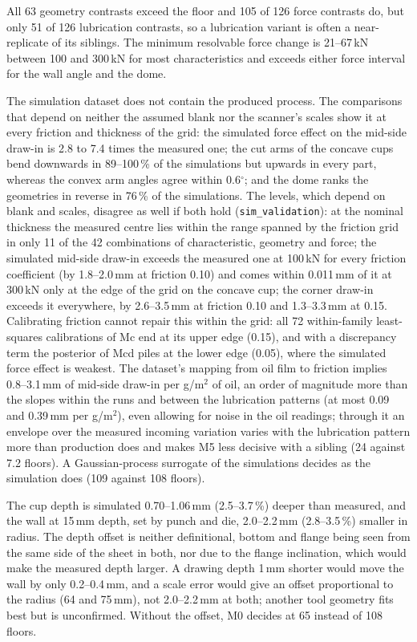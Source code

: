 \documentclass[pdflatex,sn-basic,lineno]{sn-jnl}
\newcommand{\res}[1]{\texttt{#1}}  %
\begin{document}
All 63 geometry contrasts exceed the floor and 105 of 126 force contrasts do, but only 51 of 126 lubrication contrasts, so a lubrication variant is often a near-replicate of its siblings. The minimum resolvable force change is 21--67\,kN between 100 and 300\,kN for most characteristics and exceeds either force interval for the wall angle and the dome.

The simulation dataset does not contain the produced process. The comparisons that depend on neither the assumed blank nor the scanner's scales show it at every friction and thickness of the grid: the simulated force effect on the mid-side draw-in is 2.8 to 7.4 times the measured one; the cut arms of the concave cups bend downwards in 89--100\,\% of the simulations but upwards in every part, whereas the convex arm angles agree within 0.6$^\circ$; and the dome ranks the geometries in reverse in 76\,\% of the simulations. The levels, which depend on blank and scales, disagree as well if both hold (\res{sim\_validation}): at the nominal thickness the measured centre lies within the range spanned by the friction grid in only 11 of the 42 combinations of characteristic, geometry and force; the simulated mid-side draw-in exceeds the measured one at 100\,kN for every friction coefficient (by 1.8--2.0\,mm at friction 0.10) and comes within 0.011\,mm of it at 300\,kN only at the edge of the grid on the concave cup; the corner draw-in exceeds it everywhere, by 2.6--3.5\,mm at friction 0.10 and 1.3--3.3\,mm at 0.15. Calibrating friction cannot repair this within the grid: all 72 within-family least-squares calibrations of Mc end at its upper edge (0.15), and with a discrepancy term the posterior of Mcd piles at the lower edge (0.05), where the simulated force effect is weakest. The dataset's mapping from oil film to friction implies 0.8--3.1\,mm of mid-side draw-in per g/m$^2$ of oil, an order of magnitude more than the slopes within the runs and between the lubrication patterns (at most 0.09 and 0.39\,mm per g/m$^2$), even allowing for noise in the oil readings; through it an envelope over the measured incoming variation varies with the lubrication pattern more than production does and makes M5 less decisive with a sibling (24 against 7.2 floors). A Gaussian-process surrogate of the simulations decides as the simulation does (109 against 108 floors).

The cup depth is simulated 0.70--1.06\,mm (2.5--3.7\,\%) deeper than measured, and the wall at 15\,mm depth, set by punch and die, 2.0--2.2\,mm (2.8--3.5\,\%) smaller in radius. The depth offset is neither definitional, bottom and flange being seen from the same side of the sheet in both, nor due to the flange inclination, which would make the measured depth larger. A drawing depth 1\,mm shorter would move the wall by only 0.2--0.4\,mm, and a scale error would give an offset proportional to the radius (64 and 75\,mm), not 2.0--2.2\,mm at both; another tool geometry fits best but is unconfirmed. Without the offset, M0 decides at 65 instead of 108 floors.
\end{document}
